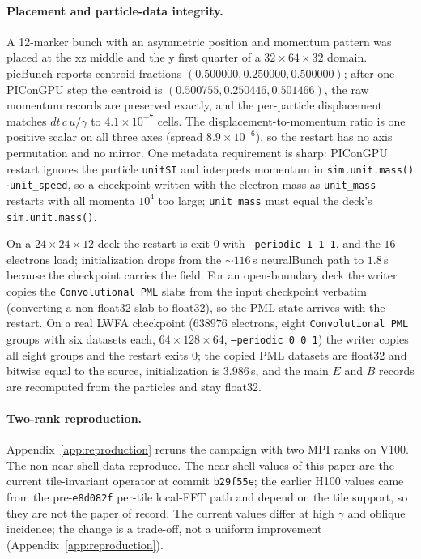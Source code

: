 \paragraph{Placement and particle-data integrity.}
A 12-marker bunch with an asymmetric position and momentum pattern was
placed at the xz middle and the y first quarter of a $32\times64\times32$
domain.  picBunch reports centroid fractions
$(0.500000,0.250000,0.500000)$; after one PIConGPU step the centroid is
$(0.500755,0.250446,0.501466)$, the raw momentum records are preserved
exactly, and the per-particle displacement matches $dt\,c\,u/\gamma$ to
$4.1\times10^{-7}$ cells.  The displacement-to-momentum ratio is one
positive scalar on all three axes (spread $8.9\times10^{-6}$), so the
restart has no axis permutation and no mirror.  One metadata requirement is
sharp: PIConGPU restart ignores the particle \texttt{unitSI} and interprets
momentum in \texttt{sim.unit.mass()}$\cdot$\texttt{unit\_speed}, so a
checkpoint written with the electron mass as \texttt{unit\_mass} restarts
with all momenta $10^{4}$ too large; \texttt{unit\_mass} must equal the
deck's \texttt{sim.unit.mass()}.

On a $24\times24\times12$ deck the restart is exit 0 with
\texttt{--periodic 1 1 1}, and the $16$ electrons load; initialization
drops from the $\sim116$\,s neuralBunch path to $1.8$\,s because the
checkpoint carries the field. For an open-boundary deck the writer copies
the \texttt{Convolutional PML} slabs from the input checkpoint verbatim
(converting a non-float32 slab to float32), so the PML state arrives with
the restart. On a real LWFA checkpoint ($638976$ electrons, eight
\texttt{Convolutional PML} groups with six datasets each,
$64\times128\times64$, \texttt{--periodic 0 0 1}) the writer copies all
eight groups and the restart exits 0; the copied PML datasets are float32
and bitwise equal to the source, initialization is $3.986$\,s, and the
main $E$ and $B$ records are recomputed from the particles and stay
float32.

\paragraph{Two-rank reproduction.}
Appendix~\ref{app:reproduction} reruns the campaign with two MPI ranks on
V100.  The non-near-shell data reproduce.  The near-shell values of this
paper are the current tile-invariant operator at commit \texttt{b29f55e};
the earlier H100 values came from the pre-\texttt{e8d082f} per-tile
local-FFT path and depend on the tile support, so they are not the paper of
record.  The current values differ at high $\gamma$ and oblique incidence;
the change is a trade-off, not a uniform improvement
(Appendix~\ref{app:reproduction}).
